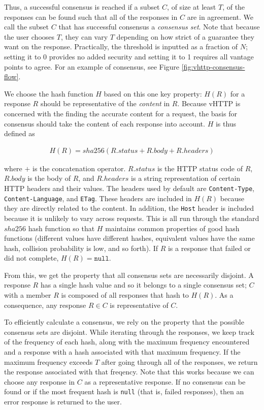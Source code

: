 Thus, a successful consensus is reached if a subset $C$, of size at least $T$,
of the responses can be found such that all of the responses in $C$ are in
agreement. We call the subset $C$ that has successful consensus a
\textit{consensus set}. Note that because the user chooses $T$, they can vary
$T$ depending on how strict of a guarantee they want on the response.
Practically, the threshold is inputted as a fraction of $N$; setting it to 0
provides no added security and setting it to 1 requires all vantage points to
agree. For an example of consensus, see Figure \ref{fig:vhttp-consensus-flow}.

We choose the hash function $H$ based on this one key property: $H(R)$ for a
response $R$ should be representative of the \emph{content} in $R$. Because
vHTTP is concerned with the finding the accurate content for a request, the
basis for consensus should take the content of each response into account.
$H$ is thus defined as

\begin{align*}
  H(R) = sha256(R.status + R.body + R.headers)
\end{align*}

where $+$ is the concatenation operator. $R.status$ is the HTTP status code of
$R$, $R.body$ is the body of $R$, and $R.headers$ is a string representation
of certain HTTP headers and their values. The headers used by default are
\texttt{Content-Type}, \texttt{Content-Language}, and \texttt{ETag}. These
headers are included in $H(R)$ because they are directly related to the
content. In addition, the \texttt{Host} header is included because it is
unlikely to vary across requests. This is all run through the standard $sha256$
hash function so that $H$ maintains common properties of good hash functions
(different values have different hashes, equivalent values have the same hash,
collision probability is low, and so forth). If $R$ is a response that failed
or did not complete, $H(R) = \texttt{null}$.

From this, we get the property that all consensus sets are necessarily
disjoint. A response $R$ has a single hash value and so it belongs to a single
consensus set; $C$ with a member $R$ is composed of all responses that hash to
$H(R)$. As a consequence, any response $R \in C$ is representative of $C$.

To efficiently calculate a consensus, we rely on the property that the possible
consensus sets are disjoint. While iterating through the responses, we
keep track of the frequency of each hash, along with the maximum frequency
encountered and a response with a hash associated with that maximum frequency.
If the maximum frequency exceeds $T$ after going through all of the responses,
we return the response associated with that freqency. Note that this works
because we can choose any response in $C$ as a representative response.
If no consensus can be found or if the most frequent hash is \texttt{null}
(that is, failed responses), then an error response is returned to the user.

